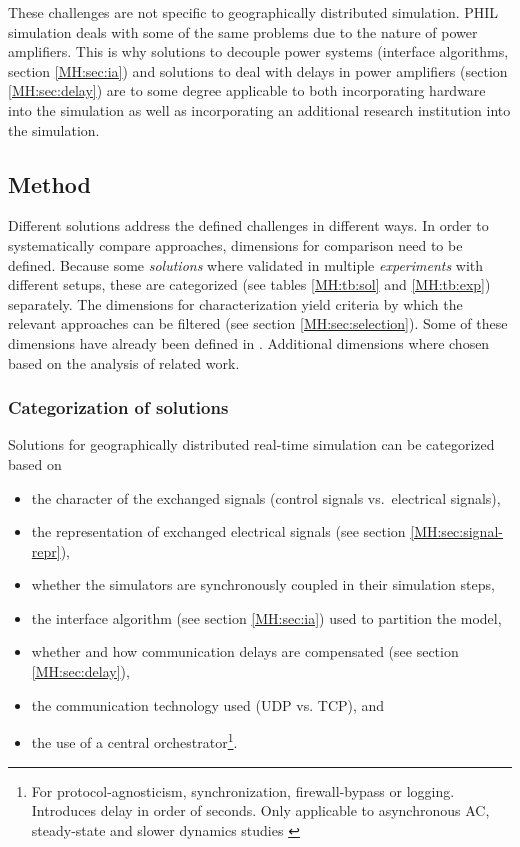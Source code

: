 \documentclass[a4paper,ngerman]{atseminar}
\begin{document}
These challenges are not specific to geographically distributed simulation. PHIL simulation deals with some of the same problems due to the nature of power amplifiers. This is why solutions to decouple power systems (interface algorithms, section \ref{MH:sec:ia}) and solutions to deal with delays in power amplifiers (section \ref{MH:sec:delay}) are to some degree applicable to both incorporating hardware into the simulation as well as incorporating an additional research institution into the simulation.

\subsection{Method}
\label{MH:sec:method}

Different solutions address the defined challenges in different ways. In order to systematically compare approaches, dimensions for comparison need to be defined. Because some \textit{solutions} where validated in multiple \textit{experiments} with different setups, these are categorized (see tables \ref{MH:tb:sol} and \ref{MH:tb:exp}) separately. The dimensions for characterization yield criteria by which the relevant approaches can be filtered (see section \ref{MH:sec:selection}). Some of these dimensions have already been defined in \cite{syed2020standard}. Additional dimensions where chosen based on the analysis of related work.

\subsubsection{Categorization of solutions}
\label{MH:sec:cat-sol}

Solutions for geographically distributed real-time simulation can be categorized based on

\begin{itemize}
    
    \item the character of the exchanged signals (control signals vs.~electrical signals),
    \item the representation of exchanged electrical signals (see section \ref{MH:sec:signal-repr}),
    \item whether the simulators are synchronously coupled in their simulation steps,
    \item the interface algorithm (see section \ref{MH:sec:ia}) used to partition the model,
    \item whether and how communication delays are compensated (see section \ref{MH:sec:delay}), 
    \item the communication technology used (UDP vs. TCP), and %
    \item the use of a central orchestrator\footnote{For protocol-agnosticism, synchronization, firewall-bypass or logging. Introduces delay in order of seconds. Only applicable to asynchronous AC, steady-state and slower dynamics studies \cite{syed2020standard}}.

\end{itemize}
\end{document}
